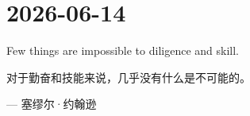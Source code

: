 \section*{2026-06-14}
Few things are impossible to diligence and skill. \par
对于勤奋和技能来说，几乎没有什么是不可能的。 \par
\hfill --- 塞缪尔·约翰逊  \par
